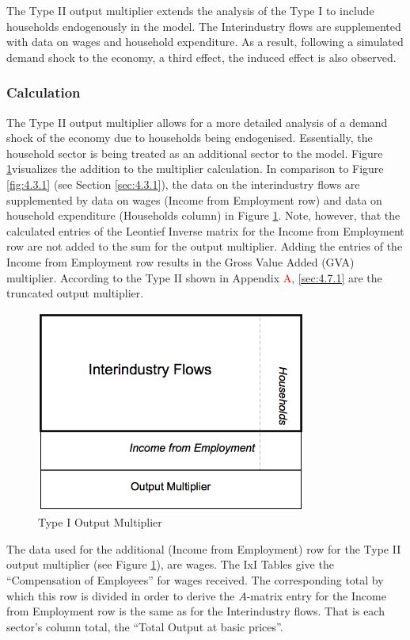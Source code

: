\begin{doublespacing}
The Type II output multiplier extends the analysis of the Type I to include households endogenously in the model. The Interindustry flows are supplemented with data on wages and household expenditure. As a result, following a simulated demand shock to the economy, a third effect, the induced effect is also observed.

\subsubsection{Calculation}

The Type II output multiplier allows for a more detailed analysis of a demand shock of the economy due to households being endogenised. Essentially, the household sector is being treated as an additional sector to the model. Figure \ref{fig:4.3.2}visualizes the addition to the multiplier calculation. In comparison to Figure \ref{fig:4.3.1} (see Section \ref{sec:4.3.1}), the data on the interindustry flows are supplemented by data on wages (Income from Employment row) and data on household expenditure (Households column) in Figure \ref{fig:4.3.2}. Note, however, that the calculated entries of the Leontief Inverse matrix for the Income from Employment row are not added to the sum for the output multiplier. Adding the entries of the Income from Employment row results in the Gross Value Added (GVA) multiplier. According to  the Type II shown in Appendix \textcolor{red}A, \ref{sec:4.7.1} are the truncated output multiplier.

\bigskip
\begin{figure}[hb]
\label{fig:4.3.2}
  \centering
  \includegraphics[width=3.5in]{T2OutputMultiplier}
  \caption{Type I Output Multiplier}
\end{figure}
\bigskip

The data used for the additional (Income from Employment) row for the Type II output multiplier (see Figure \ref{fig:4.3.2}), are wages. The IxI Tables give the ``Compensation of Employees'' for wages received. The corresponding total by which this row is divided in order to derive the $\textit{A}$-matrix entry for the Income from Employment row is the same as for the Interindustry flows. That is each sector's column total, the ``Total Output at basic prices''.


\end{doublespacing}
